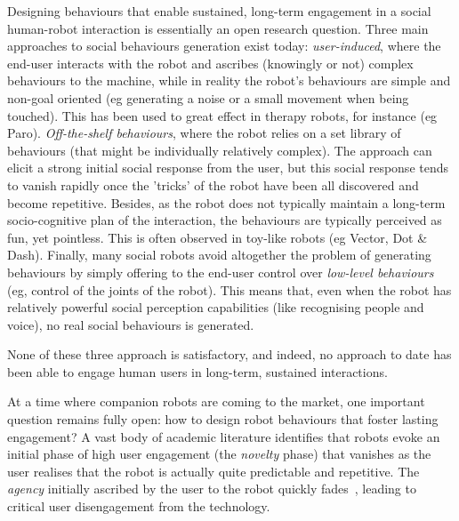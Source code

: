 \documentclass[11pt,a4paper]{report}
\newcommand{\project}{WizUs\xspace}
\begin{document}
%

Designing behaviours that
enable sustained, long-term engagement in a social human-robot interaction is
essentially an open research question. Three main approaches to social
behaviours generation exist today: \emph{user-induced}, where the end-user
interacts with the robot and ascribes (knowingly or not) complex behaviours to
the machine, while in reality the robot's behaviours are simple and non-goal
oriented (eg generating a noise or a small movement when being touched). This
has been used to great effect in therapy robots, for instance (eg Paro).
\emph{Off-the-shelf behaviours}, where the robot relies on a set library of
behaviours (that might be individually relatively complex). The approach can
elicit a strong initial social response from the user, but this social response
tends to vanish rapidly once the 'tricks' of the robot have been all discovered
and become repetitive.  Besides, as the robot does not typically maintain a
long-term socio-cognitive plan of the interaction, the behaviours are typically
perceived as fun, yet pointless. This is often observed in toy-like robots (eg
Vector, Dot \& Dash). Finally, many social robots avoid altogether the problem
of generating behaviours by simply offering to the end-user control over
\emph{low-level behaviours} (eg, control of the joints of the robot). This means
that, even when the robot has relatively powerful social perception capabilities
(like recognising people and voice), no real social behaviours is generated.

None of these three approach is satisfactory, and indeed, no approach to date
has been able to engage human users in long-term, sustained interactions.




At a time where companion robots are coming to the market, one important
question remains fully open: how to design robot behaviours that foster
lasting engagement? A vast body of academic literature identifies that
robots evoke an initial phase of high user engagement (the
\emph{novelty} phase) that vanishes as the user realises that the robot
is actually quite predictable and repetitive. The \emph{agency}
initially ascribed by the user to the robot quickly
fades~\cite{lemaignan2014dynamics}, leading to critical user disengagement from the technology.
\end{document}
